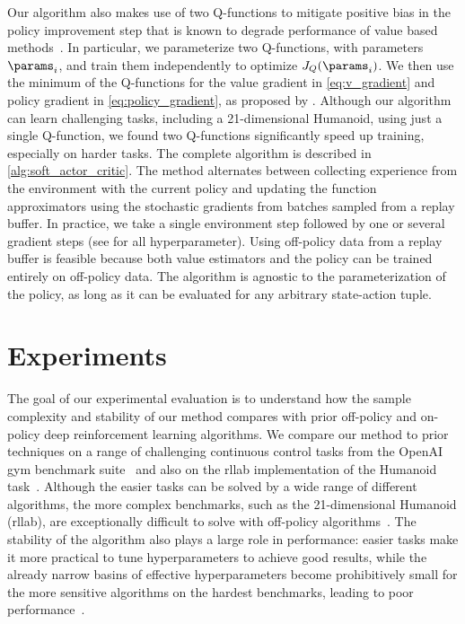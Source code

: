 \documentclass{article}
\begin{document}
Our algorithm also makes use of two Q-functions to mitigate  positive bias in the policy improvement step that is known to degrade performance of value based methods~\citep{hasselt2010double,fujimoto2018addressing}. In particular, we parameterize two Q-functions, with parameters $\params_i$, and train them independently to optimize $J_Q(\params_i)$. We then use the minimum of the Q-functions for the value gradient in \autoref{eq:v_gradient} and policy gradient in \autoref{eq:policy_gradient}, as proposed by \citet{fujimoto2018addressing}. Although our algorithm can learn challenging tasks, including a 21-dimensional Humanoid, using just a single Q-function, we found two Q-functions significantly speed up training, especially on harder tasks. The complete algorithm is described in \autoref{alg:soft_actor_critic}. The method alternates between collecting experience from the environment with the current policy and updating the function approximators using the stochastic gradients from batches sampled from a replay buffer. In practice, we take a single environment step followed by one or several gradient steps (see  for all hyperparameter). Using off-policy data from a replay buffer is feasible because both value estimators and the policy can be trained entirely on off-policy data. The algorithm is agnostic to the parameterization of the policy, as long as it can be evaluated for any arbitrary state-action tuple.




\section{Experiments}
\label{sec:experiments}

The goal of our experimental evaluation is to understand how the sample complexity and stability of our method compares with prior off-policy and on-policy deep reinforcement learning algorithms. We compare our method to prior techniques on a range of challenging continuous control tasks from the OpenAI gym benchmark suite~\citep{brockman2016openai} and also on the rllab implementation of the Humanoid task~\citep{duan2016benchmarking}. Although the easier tasks can be solved by a wide range of different algorithms, the more complex benchmarks, such as the 21-dimensional Humanoid (rllab), are exceptionally difficult to solve with off-policy algorithms~\citep{duan2016benchmarking}. The stability of the algorithm also plays a large role in performance: easier tasks make it more practical to tune hyperparameters to achieve good results, while the already narrow basins of effective hyperparameters become prohibitively small for the more sensitive algorithms on the hardest benchmarks, leading to poor performance~\citep{gu2016q}. 
\end{document}
